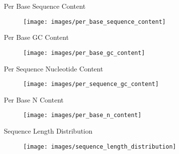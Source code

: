 \documentclass{beamer}
\begin{document}
\begin{frame}{Per Base Sequence Content}

\begin{figure}[htbp]
\centering
\texttt{[image: images/per\_base\_sequence\_content]}

\end{figure}

\end{frame}

\begin{frame}{Per Base GC Content}

\begin{figure}[htbp]
\centering
\texttt{[image: images/per\_base\_gc\_content]}

\end{figure}

\end{frame}

\begin{frame}{Per Sequence Nucleotide Content}

\begin{figure}[htbp]
\centering
\texttt{[image: images/per\_sequence\_gc\_content]}

\end{figure}

\end{frame}

\begin{frame}{Per Base N Content}

\begin{figure}[htbp]
\centering
\texttt{[image: images/per\_base\_n\_content]}

\end{figure}

\end{frame}

\begin{frame}{Sequence Length Distribution}

\begin{figure}[htbp]
\centering
\texttt{[image: images/sequence\_length\_distribution]}

\end{figure}

\end{frame}
\end{document}
